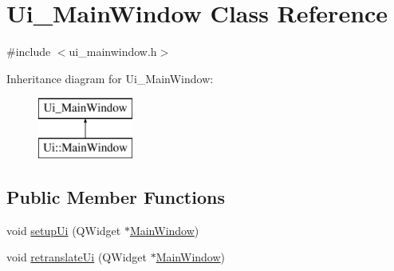 \hypertarget{class_ui___main_window}{}\section{Ui\+\_\+\+Main\+Window Class Reference}
\label{class_ui___main_window}


{\ttfamily \#include $<$ui\+\_\+mainwindow.\+h$>$}

Inheritance diagram for Ui\+\_\+\+Main\+Window\+:\begin{figure}[H]
\begin{center}
\leavevmode
\includegraphics[height=2.000000cm]{class_ui___main_window}
\end{center}
\end{figure}
\subsection*{Public Member Functions}
\begin{DoxyCompactItemize}
\item 
void \mbox{\hyperlink{class_ui___main_window_a306e3013ead511f9bc29513aa0219579}{setup\+Ui}} (Q\+Widget $\ast$\mbox{\hyperlink{class_main_window}{Main\+Window}})
\item 
void \mbox{\hyperlink{class_ui___main_window_ae4964a56cb4d6d76b7a398fd76b200e2}{retranslate\+Ui}} (Q\+Widget $\ast$\mbox{\hyperlink{class_main_window}{Main\+Window}})
\end{DoxyCompactItemize}
